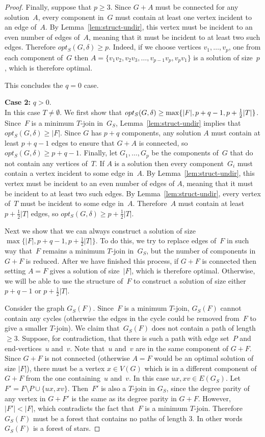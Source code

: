 \documentclass[11pt]{llncs}
\newcommand{\opts}{opt_S}
\newcommand\displaycase[1]{{\bf #1}}
\begin{document}
\begin{proof}
Finally, suppose that $p \geq 3$. Since $G+A$ must be connected for any
solution~$A$, every component in~$G$ must contain at least one vertex
incident to an edge of~$A$. By Lemma~\ref{lem:struct-undir}, this vertex must
be incident to an even number of edges of~$A$, meaning that it must be incident
to at least two such edges. Therefore $\opts(G,\delta) \geq p$.  Indeed, if we
choose vertices $v_1,\ldots,v_p$, one from each component of~$G$ then
$A=\{v_1v_2,v_2v_3,\ldots,v_{p-1}v_p,v_pv_1\}$ is a solution of size~$p$, which
is therefore optimal.

This concludes the $q=0$ case.

\medskip
\noindent
\displaycase{Case 2:} $q>0$.\\
In this case $T\neq\emptyset$. We first show that $\opts(G,\delta)\geq
\max\{|F|,p+q-\nobreak 1,\allowbreak p+\frac{1}{2}|T|\}$. Since~$F$ is a minimum $T$-join in~$G_S$,
Lemma~\ref{lem:struct-undir} implies that $\opts(G,\delta)\geq |F|$. Since $G$
has $p+q$ components, any solution $A$ must contain at least $p+q-1$ edges to
ensure that $G+A$ is connected, so $\opts(G,\delta)\geq p+q-1$. Finally, let
$G_1,\ldots,G_p$ be the components of~$G$ that do not contain any vertices
of~$T$. If $A$ is a solution then every component~$G_i$ must contain a vertex
incident to some edge in~$A$.  By Lemma~\ref{lem:struct-undir}, this vertex
must be incident to an even number of edges of $A$, meaning that it must be
incident to at least two such edges.  By Lemma~\ref{lem:struct-undir}, every
vertex of~$T$ must be incident to some edge in~$A$. Therefore~$A$ must contain
at least $p+\frac{1}{2}|T|$ edges, so $\opts(G,\delta)\geq p+\frac{1}{2}|T|$.

Next we show that we can always construct a solution of size
$\max\{|F|,\allowbreak p+q-1,p+\frac{1}{2}|T|\}$. To do this, we try to replace edges of~$F$
in such way that~$F$ remains a minimum $T$-join in~$G_S$, but the number of
components in $G+F$ is reduced. After we have finished this process, if $G+F$
is connected then setting $A=F$ gives a solution of size~$|F|$, which is
therefore optimal. Otherwise, we will be able to use the structure of~$F$ to
construct a solution of size either $p+q-1$ or $p+\frac{1}{2}|T|$.

Consider the graph $G_S(F)$. Since~$F$ is a minimum $T$-join, $G_S(F)$ cannot
contain any cycles (otherwise the edges in the cycle could be removed from~$F$
to give a smaller $T$-join).  We claim that~$G_S(F)$ does not contain a path of
length $\geq 3$.  Suppose, for contradiction, that there is such a path with
edge set~$P$ and end-vertices~$u$ and~$v$.  Note that~$u$ and~$v$ are in the
same component of $G+F$. Since $G+F$ is not connected (otherwise $A=F$ would be
an optimal solution of size $|F|$), there must be a vertex $x \in V(G)$ which
is in a different component of $G+F$ from the one containing~$u$ and~$v$. In this
case $ux,xv \in E(G_S)$.  Let~$F'=F\setminus P \cup \{ux,xv\}$. Then~$F'$ is
also a $T$-join in $G_S$, since the degree parity of any vertex in $G+F'$ is
the same as its degree parity in $G+F$. However, $|F'|<|F|$, which contradicts
the fact that~$F$ is a minimum $T$-join.  Therefore $G_S(F)$ must be a forest
that contains no paths of length 3. In other words $G_S(F)$ is a forest of
stars.


\end{proof}
\end{document}
